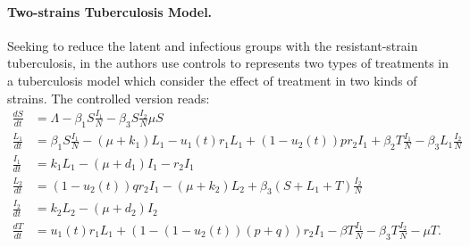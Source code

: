 \paragraph{Two-strains Tuberculosis Model.}
Seeking to reduce the latent and infectious groups with the 
resistant-strain tuberculosis, in \cite{Lenhart2002} the authors  use 
controls to represents two types of treatments in a tuberculosis model 
which consider the effect of treatment in two kinds of strains. The 
controlled version reads:
%
%	
%
%
	\begin{equation}\label{eqn:MDR-TB_model}
	  \begin{aligned}
	    \frac{dS}{dt} &=
		    \Lambda - \beta_1 S \frac{I_1}{N} 
		    - \beta_3 S \frac{I_2}{N}
		    \mu S
		  \\
		  \frac{L_1}{dt} &=
			  \beta_1 S \frac{I_1}{N}
			  - (\mu + k_1) L_1
			  - u_1 (t) r_1 L_1
			  + (1 - u_2 (t)) p r_2 I_1
				+ \beta_2 T \frac{I_1}{N}
				- \beta_3 L_1 \frac{I_2}{N}
			\\
			\frac{I_1}{dt} &= 
				k_1 L_1
				- (\mu + d_1) I_1
				-r_2 I_1
			\\
			\frac{L_2}{dt} &=
				(1 - u_2(t)) q r_2 I_1
				- (\mu + k_2) L_2
				+ \beta_3 (S + L_1 + T) \frac{I_2}{N}
			\\
			\frac{I_2}{dt} &=
				k_2 L_2 - (\mu + d_2) I_2
			\\
			\frac{d T}{dt} &=
				u_1(t) r_1 L_1
				+ (1 - (1 - u_2(t))(p + q)) r_2 I_1
				- \beta T \frac{I_1}{N}
				- \beta_3 T \frac{I_2}{N}
				-\mu T.
	  \end{aligned}
	\end{equation}

